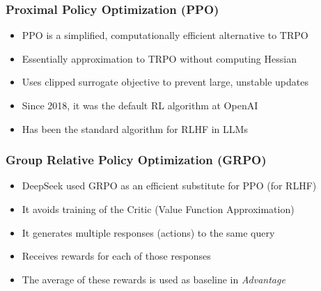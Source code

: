 \documentclass[handout]{beamer}
\begin{document}
\begin{frame}
\frametitle{Proximal Policy Optimization (PPO)}
\begin{itemize}
\item PPO is a simplified, computationally efficient alternative to TRPO
\item Essentially approximation to TRPO without computing Hessian
\item Uses clipped surrogate objective to prevent large, unstable updates
\item Since 2018, it was the default RL algorithm at OpenAI
\item Has been the standard algorithm for RLHF in LLMs
\end{itemize}
\end{frame}

\begin{frame}
\frametitle{Group Relative Policy Optimization (GRPO)}
\begin{itemize}
\item DeepSeek used GRPO as an efficient substitute for PPO (for RLHF)
\item It avoids training of the Critic (Value Function Approximation)
\item It generates multiple responses (actions) to the same query
\item Receives rewards for each of those responses
\item The average of these rewards is used as baseline in {\em Advantage}
\end{itemize}
\end{frame}
\end{document}

